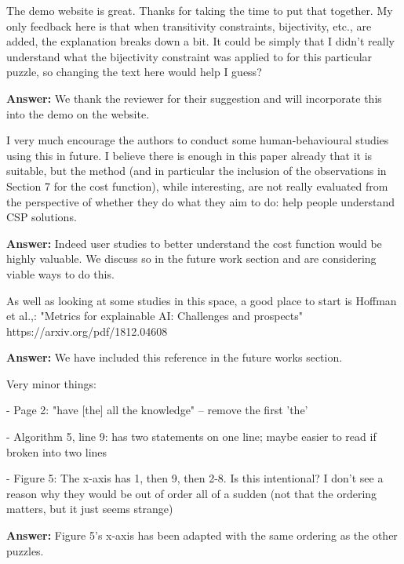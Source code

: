 \documentclass{article}
\newcommand\comment[1]{\marginpar{\tiny #1}}
\renewcommand\comment[1]{#1}
\newcommand{\tias}[1]{{\comment{\color{blue}\textsc{TG:}#1}}}
\newcommand{\emilio}[1]{{\comment{\color{red} \textsc{EG:}#1}}}
\newcommand{\answer}[1]{{\comment{\textbf{Answer:} #1}}}
\newcommand{\bart}[1]{{\comment{\color{green} \textsc{BB:}#1}}}
\begin{document}
\begin{quoteit}
The demo website is great. Thanks for taking the time to put that together. My only feedback here is that when transitivity constraints, bijectivity, etc., are added, the explanation breaks down a bit. It could be simply that I didn't really  understand what the bijectivity constraint was applied to for this particular puzzle, so changing the text here would help I guess?
\end{quoteit}

\answer{We thank the reviewer for their suggestion and will incorporate this into the demo on the website.} 

\begin{quoteit}
I very much encourage the authors to conduct some human-behavioural studies using this in future. I believe there is enough in this paper already that it is suitable, but the method (and in particular the inclusion of the observations in Section 7 for the cost function), while interesting, are not really evaluated from the perspective of whether they do what they aim to do: help people understand CSP solutions. 
\end{quoteit}

\answer{Indeed user studies to better understand the cost function would be highly valuable. We discuss so in the future work section and are considering viable ways to do this.} 


\begin{quoteit}
As well as looking at some studies in this space, a good place to start is Hoffman et al.,: "Metrics for explainable AI: Challenges and prospects" https://arxiv.org/pdf/1812.04608 
\end{quoteit}

\answer{We have included this reference in the future works section.}
\begin{quoteit}
Very minor things:

- Page 2: "have [the] all the knowledge" -- remove the first 'the'

- Algorithm 5, line 9: has two statements on one line; maybe easier to
read if broken into two lines

- Figure 5: The x-axis has 1, then 9, then 2-8. Is this intentional? I
don't see a reason why they would be out of order all of a sudden (not
that the ordering matters, but it just seems strange)
\end{quoteit}

\answer{Figure 5's x-axis has been adapted with the same ordering as the other puzzles.}




\end{document}
